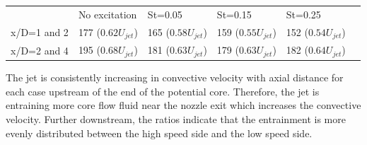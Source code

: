 \documentclass[english]{aiaa-tc}
\begin{document}
\begin{center}
	\begin{tabular}{|l|l|l|l|l|l}
		 & No excitation & St=0.05 & St=0.15 & St=0.25 \\
		x/D=1 and 2 & 177 ($0.62U_{jet}$) & 165 ($0.58U_{jet}$) & 159 ($0.55U_{jet}$) & 152 ($0.54U_{jet}$) \\
		x/D=2 and 4 & 195 ($0.68U_{jet}$) & 181 ($0.63U_{jet}$) & 179 ($0.63U_{jet}$) & 182 ($0.64U_{jet}$) \\
	\end{tabular}
	\label{tab:nearnozzleconvec}
\end{center}
The jet is consistently increasing in convective velocity with axial distance for each case upstream of the end of the potential core.
Therefore, the jet is entraining more core flow fluid near the nozzle exit which increases the convective velocity. Further downstream, the ratios indicate that the entrainment is more evenly distributed between the high speed side and the low speed side.

\end{document}
